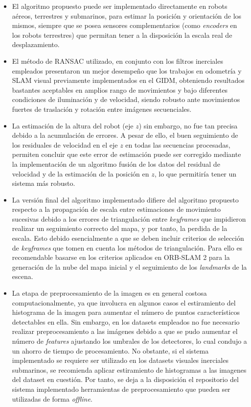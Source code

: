 \begin{itemize}
	\item El algoritmo propuesto puede ser implementado directamente en robots aéreos, terrestres y submarinos, para estimar la posición y orientación de los mismos, siempre que se posea sensores complementarios (como \textit{encoders} en los robots terrestres) que permitan tener a la disposición la escala real de desplazamiento.
	\item El método de RANSAC utilizado, en conjunto con los filtros inerciales empleados presentaron un mejor desempeño que los trabajos en odometría y SLAM visual previamente implementados en el GIDM, obteniendo resultados bastantes aceptables en amplios rango de movimientos y bajo diferentes condiciones de iluminación y de velocidad, siendo robusto ante movimientos fuertes de traslación y rotación entre imágenes secuenciales.
	\item La estimación de la altura del robot (eje $z$) sin embargo, no fue tan precisa debido a la acumulación de errores. A pesar de ello, el buen seguimiento de los residuales de velocidad en el eje $z$ en todas las secuencias procesadas, permiten concluir que este error de estimación puede ser corregido mediante la implementación de un algoritmo fusión de los datos del residual de velocidad y de la estimación de la posición en $z$, lo que permitiría tener un sistema más robusto. 
	\item La versión final del algoritmo implementado difiere del algoritmo propuesto respecto a la propagación de escala entre estimaciones de movimiento sucesivas debido a los errores de triangulación entre \textit{keyframes} que impidieron realizar un seguimiento correcto del mapa, y por tanto, la perdida de la escala. Esto debido esencialmente a que se deben incluir criterios de selección de \textit{keyframes} que tomen en cuenta los métodos de triangulación. Para ello es recomendable basarse en los criterios aplicados en ORB-SLAM 2 para la generación de la nube del mapa inicial y el seguimiento de los \textit{landmarks} de la escena.
	\item La etapa de preprocesamiento de la imagen es en general costosa computacionalmente, ya que involucra en algunos casos el estiramiento del histograma de la imagen para aumentar el número de puntos característicos detectables en ella. Sin embargo, en los datasets empleados no fue necesario realizar preprocesamiento a las imágenes debido a que se pudo aumentar el número de \textit{features} ajustando los umbrales de los detectores, lo cual condujo a un ahorro de tiempo de procesamiento. No obstante, si el sistema implementado se requiere ser utilizado en los datasets visuales inerciales submarinos, se recomienda aplicar estiramiento de histogramas a las imagenes del dataset en cuestión. Por tanto, se deja a la disposición el repositorio del sistema implementado herramientas de preprocesamiento que pueden ser utilizadas de forma \textit{offline}.
	

\end{itemize}
